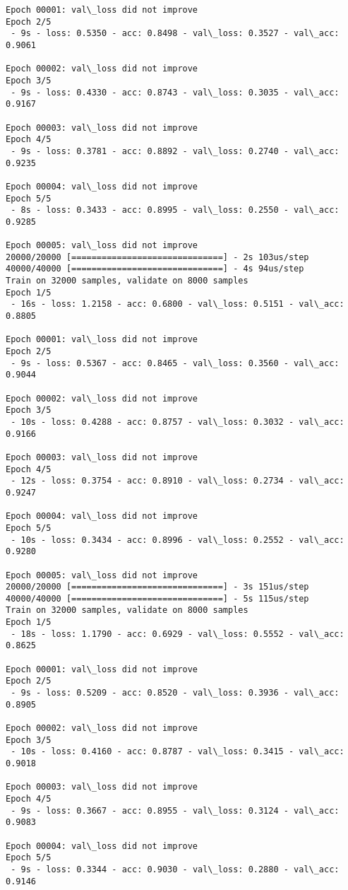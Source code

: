 \documentclass[11pt]{article}
\begin{document}
\begin{Verbatim}[commandchars=\\\{\}]
Epoch 00001: val\_loss did not improve
Epoch 2/5
 - 9s - loss: 0.5350 - acc: 0.8498 - val\_loss: 0.3527 - val\_acc: 0.9061

Epoch 00002: val\_loss did not improve
Epoch 3/5
 - 9s - loss: 0.4330 - acc: 0.8743 - val\_loss: 0.3035 - val\_acc: 0.9167

Epoch 00003: val\_loss did not improve
Epoch 4/5
 - 9s - loss: 0.3781 - acc: 0.8892 - val\_loss: 0.2740 - val\_acc: 0.9235

Epoch 00004: val\_loss did not improve
Epoch 5/5
 - 8s - loss: 0.3433 - acc: 0.8995 - val\_loss: 0.2550 - val\_acc: 0.9285

Epoch 00005: val\_loss did not improve
20000/20000 [==============================] - 2s 103us/step
40000/40000 [==============================] - 4s 94us/step
Train on 32000 samples, validate on 8000 samples
Epoch 1/5
 - 16s - loss: 1.2158 - acc: 0.6800 - val\_loss: 0.5151 - val\_acc: 0.8805

Epoch 00001: val\_loss did not improve
Epoch 2/5
 - 9s - loss: 0.5367 - acc: 0.8465 - val\_loss: 0.3560 - val\_acc: 0.9044

Epoch 00002: val\_loss did not improve
Epoch 3/5
 - 10s - loss: 0.4288 - acc: 0.8757 - val\_loss: 0.3032 - val\_acc: 0.9166

Epoch 00003: val\_loss did not improve
Epoch 4/5
 - 12s - loss: 0.3754 - acc: 0.8910 - val\_loss: 0.2734 - val\_acc: 0.9247

Epoch 00004: val\_loss did not improve
Epoch 5/5
 - 10s - loss: 0.3434 - acc: 0.8996 - val\_loss: 0.2552 - val\_acc: 0.9280

Epoch 00005: val\_loss did not improve
20000/20000 [==============================] - 3s 151us/step
40000/40000 [==============================] - 5s 115us/step
Train on 32000 samples, validate on 8000 samples
Epoch 1/5
 - 18s - loss: 1.1790 - acc: 0.6929 - val\_loss: 0.5552 - val\_acc: 0.8625

Epoch 00001: val\_loss did not improve
Epoch 2/5
 - 9s - loss: 0.5209 - acc: 0.8520 - val\_loss: 0.3936 - val\_acc: 0.8905

Epoch 00002: val\_loss did not improve
Epoch 3/5
 - 10s - loss: 0.4160 - acc: 0.8787 - val\_loss: 0.3415 - val\_acc: 0.9018

Epoch 00003: val\_loss did not improve
Epoch 4/5
 - 9s - loss: 0.3667 - acc: 0.8955 - val\_loss: 0.3124 - val\_acc: 0.9083

Epoch 00004: val\_loss did not improve
Epoch 5/5
 - 9s - loss: 0.3344 - acc: 0.9030 - val\_loss: 0.2880 - val\_acc: 0.9146


\end{Verbatim}
\end{document}
